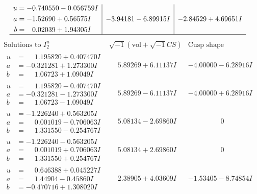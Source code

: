 \documentclass[1p]{elsarticle_modified}
\theoremstyle{definition}
\newcommand{\I}{\sqrt{-1}}
\begin{document}
$$\begin{array}{c|c|c}
\begin{aligned}
u &= -0.740550 - 0.056759 I \\
a &= -1.52690 + 0.56575 I \\
b &= \phantom{-}0.02039 + 1.94305 I\end{aligned}
 & -3.94181 - 6.89915 I & -2.84529 + 4.69651 I\\
 \hline 
 \end{array}$$\newpage$$\begin{array}{c|c|c}  
\text{Solutions to }I^u_{2}& \I (\text{vol} + \sqrt{-1}CS) & \text{Cusp shape}\\
 \hline 
\begin{aligned}
u &= \phantom{-}1.195820 + 0.407470 I \\
a &= -0.321281 + 1.273300 I \\
b &= \phantom{-}1.06723 + 1.09049 I\end{aligned}
 & \phantom{-}5.89269 + 6.11137 I & -4.00000 - 6.28916 I \\ \hline\begin{aligned}
u &= \phantom{-}1.195820 - 0.407470 I \\
a &= -0.321281 - 1.273300 I \\
b &= \phantom{-}1.06723 - 1.09049 I\end{aligned}
 & \phantom{-}5.89269 - 6.11137 I & -4.00000 + 6.28916 I \\ \hline\begin{aligned}
u &= -1.226240 + 0.563205 I \\
a &= \phantom{-}0.001019 - 0.706063 I \\
b &= \phantom{-}1.331550 - 0.254767 I\end{aligned}
 & \phantom{-}5.08134 - 2.69860 I & \phantom{-0.000000 } 0 \\ \hline\begin{aligned}
u &= -1.226240 - 0.563205 I \\
a &= \phantom{-}0.001019 + 0.706063 I \\
b &= \phantom{-}1.331550 + 0.254767 I\end{aligned}
 & \phantom{-}5.08134 + 2.69860 I & \phantom{-0.000000 } 0 \\ \hline\begin{aligned}
u &= \phantom{-}0.646388 + 0.045227 I \\
a &= \phantom{-}1.44904 - 0.45860 I \\
b &= -0.470716 + 1.308020 I\end{aligned}
 & \phantom{-}2.38905 + 4.03609 I & -1.53405 - 8.74854 I \\ \hline\begin{aligned}

\end{aligned}
\end{array}$$
\end{document}
